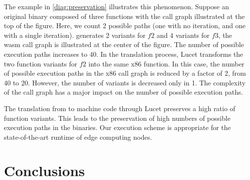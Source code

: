 

The example in \autoref{diag:preservation}  illustrates this phenomenon.
Suppose an original binary composed of three functions with the call graph illustrated at the top of the figure. Here, we count 2 possible paths (one with no iteration, and one with a single iteration).
\tool generates 2 variants for $f2$ and 4 variants for $f3$, the wasm call graph is illustrated at the center of the figure. The number of possible execution paths increases to 40.
In the translation process, Lucet transforms the two \wasm function variants for $f2$ into the same x86 function.
In this case, the number of possible execution paths in the x86 call graph is reduced by a factor of 2, from 40 to 20.
However, the number of variants is decreased only in 1. 
The complexity of the call graph has a major impact on the number of possible execution paths. 


	The translation from \wasm to machine code through Lucet preserves a high ratio of function variants. This leads to the preservation of high numbers of possible execution paths in the binaries. 
	Our execution scheme is appropriate for the state-of-the-art runtime of edge computing nodes.


\section{Conclusions}






